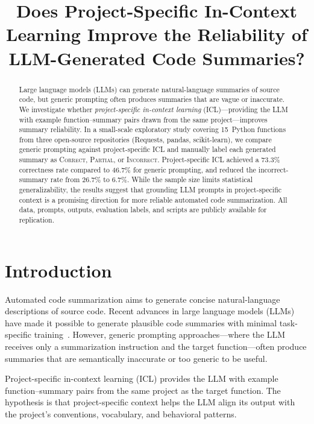 \documentclass[conference]{IEEEtran}
\title{Does Project-Specific In-Context Learning Improve the Reliability of LLM-Generated Code Summaries?}
\author{
  \IEEEauthorblockN{Author Name}
  \IEEEauthorblockA{Affiliation\\Email}
}
\begin{document}
\maketitle

\begin{abstract}
Large language models (LLMs) can generate natural-language summaries of source
code, but generic prompting often produces summaries that are vague or
inaccurate. We investigate whether \emph{project-specific in-context learning}
(ICL)---providing the LLM with example function--summary pairs drawn from the
same project---improves summary reliability. In a small-scale exploratory study
covering 15~Python functions from three open-source repositories (Requests,
pandas, scikit-learn), we compare generic prompting against project-specific
ICL and manually label each generated summary as \textsc{Correct},
\textsc{Partial}, or \textsc{Incorrect}. Project-specific ICL achieved a 73.3\%
correctness rate compared to 46.7\% for generic prompting, and reduced the
incorrect-summary rate from 26.7\% to 6.7\%. While the sample size limits
statistical generalizability, the results suggest that grounding LLM prompts in
project-specific context is a promising direction for more reliable automated
code summarization. All data, prompts, outputs, evaluation labels, and scripts
are publicly available for replication.
\end{abstract}

\section{Introduction}
\label{sec:introduction}

Automated code summarization aims to generate concise natural-language
descriptions of source code. Recent advances in large language models (LLMs)
have made it possible to generate plausible code summaries with minimal
task-specific training~\cite{brown2020language}. However, generic prompting
approaches---where the LLM receives only a summarization instruction and the
target function---often produce summaries that are semantically inaccurate or
too generic to be useful.

Project-specific in-context learning (ICL) provides the LLM with example
function--summary pairs from the same project as the target function. The
hypothesis is that project-specific context helps the LLM align its output
with the project's conventions, vocabulary, and behavioral patterns.
\end{document}
